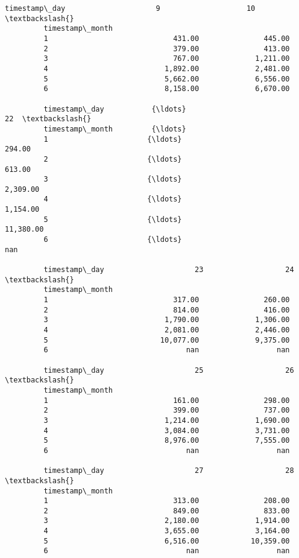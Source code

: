 \documentclass[11pt]{article}
\begin{document}
\begin{Verbatim}[commandchars=\\\{\}]
         timestamp\_day                     9                    10  \textbackslash{}
         timestamp\_month                                             
         1                             431.00               445.00   
         2                             379.00               413.00   
         3                             767.00             1,211.00   
         4                           1,892.00             2,481.00   
         5                           5,662.00             6,556.00   
         6                           8,158.00             6,670.00   
         
         timestamp\_day           {\ldots}                            22  \textbackslash{}
         timestamp\_month         {\ldots}                                 
         1                       {\ldots}                        294.00   
         2                       {\ldots}                        613.00   
         3                       {\ldots}                      2,309.00   
         4                       {\ldots}                      1,154.00   
         5                       {\ldots}                     11,380.00   
         6                       {\ldots}                           nan   
         
         timestamp\_day                     23                   24  \textbackslash{}
         timestamp\_month                                             
         1                             317.00               260.00   
         2                             814.00               416.00   
         3                           1,790.00             1,306.00   
         4                           2,081.00             2,446.00   
         5                          10,077.00             9,375.00   
         6                                nan                  nan   
         
         timestamp\_day                     25                   26  \textbackslash{}
         timestamp\_month                                             
         1                             161.00               298.00   
         2                             399.00               737.00   
         3                           1,214.00             1,690.00   
         4                           3,084.00             3,731.00   
         5                           8,976.00             7,555.00   
         6                                nan                  nan   
         
         timestamp\_day                     27                   28  \textbackslash{}
         timestamp\_month                                             
         1                             313.00               208.00   
         2                             849.00               833.00   
         3                           2,180.00             1,914.00   
         4                           3,655.00             3,164.00   
         5                           6,516.00            10,359.00   
         6                                nan                  nan   
         

\end{Verbatim}
\end{document}
